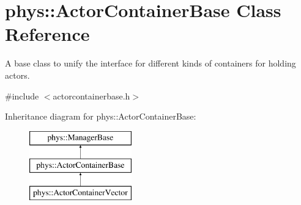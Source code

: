 \hypertarget{classphys_1_1ActorContainerBase}{
\section{phys::ActorContainerBase Class Reference}
\label{d1/d00/classphys_1_1ActorContainerBase}
}


A base class to unify the interface for different kinds of containers for holding actors.  




{\ttfamily \#include $<$actorcontainerbase.h$>$}

Inheritance diagram for phys::ActorContainerBase:\begin{figure}[H]
\begin{center}
\leavevmode
\includegraphics[height=3cm]{d1/d00/classphys_1_1ActorContainerBase}
\end{center}
\end{figure}
